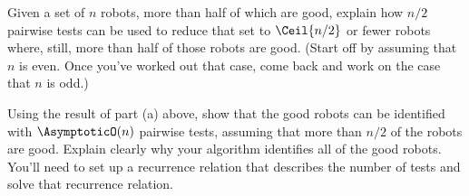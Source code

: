 \documentclass{ks-pset}
\begin{document}
\begin{problem}
  \begin{subproblems}
    \item Given a set of \(n\) robots, more than half of which are good,
      explain how \(n/2\) pairwise tests can be used to reduce that set to
      \(\Ceil{n/2}\) or fewer robots where, still, more than half of those
      robots are good.  (Start off by assuming that \(n\) is even.  Once you've
      worked out that case, come back and work on the case that \(n\) is odd.)
    \item Using the result of part (a) above, show that the good robots can be
      identified with \(\AsymptoticO(n)\) pairwise tests, assuming that more
      than \(n/2\) of the robots are good.  Explain clearly why your algorithm
      identifies all of the good robots.  You'll need to set up a recurrence
      relation that describes the number of tests and solve that recurrence
      relation.
  \end{subproblems}

\end{problem}

\begin{solution}

\end{solution}
\end{document}
